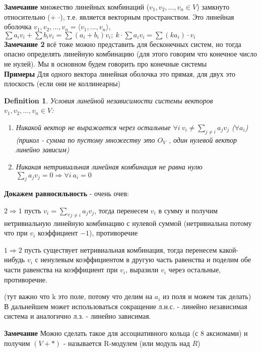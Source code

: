 \documentclass[12pt]{article}
\newtheorem{definition}{Definition}
\begin{document}
\textbf{Замечание} множество линейных комбинаций ($v_1, v_2, ..., v_n \in V$) замкнуто относительно (+ $\cdot$), т.е. является векторным пространством. Это линейная оболочка $v_1, v_2, ..., v_n = \langle v_1, ..., v_n \rangle$, $\sum a_iv_i+\sum b_iv_i=\sum (a_i+b_i)v_i;\ k\cdot \sum a_iv_i=\sum (ka_i)\cdot v_i$ \\


\textbf{Замечание 2} всё тоже можно представить для бесконечных систем, но тогда опасно определять линейную комбинацию (для этого говорим что конечное число не нулей). Мы в основном будем говорить про конечные системы
\\

\textbf{Примеры} Для одного вектора линейная оболочка это прямая, для двух это плоскость (если они не коллинеарны) 


\begin{definition}
    Условия линейной независимости системы векторов $v_1, v_2, ..., v_n \in V$:
    \begin{enumerate}
        \item  Никакой вектор не выражается через остальные $\forall i\ v_i\neq \sum_{j\neq i} {a_jv_j}$ ($\forall a_i$)
        (прикол - сумма по пустому множеству это $O_V$ , один нулевой вектор линейно зависим)
        \item Никакая нетривиальная линейная комбинация не равна нулю $\sum_{j} {a_jv_j}=0\Rightarrow \forall i\ a_i=0$
    \end{enumerate}

\end{definition}
 

\textbf{Докажем равносильность} - очень очев: 

$2 \Rightarrow 1$ пусть $v_i = \sum_{\forall j \neq i} {a_jv_j}$, тогда перенесем $v_i$ в сумму и получим нетривиальную линейную комбинацию с нулевой суммой (нетривиальна потому что при $v_i$ коэффициент $-1$), противоречие

$1 \Rightarrow 2$ пусть существует нетривиальная комбинация, тогда перенесем какой-нибудь $v_i$ с ненулевым коэффициентом в другую часть равенства и поделим обе части равенства на коэффициент при $v_i$, выразили $v_i$ через остальные, противоречие.

(тут важно что k это поле, потому что делим на $a_i$ из поля и можем так делать) 
В дальнейшем может использоваться сокращение л.н.с. - линейно независимая система и аналогично л.з. - линейно зависимая.

\textbf{Замечание} Можно сделать такое для ассоциативного кольца (с 8 аксиомами) и получим $(V + *)$ - называется R-модулем (или модуль над $R$)
\end{document}
